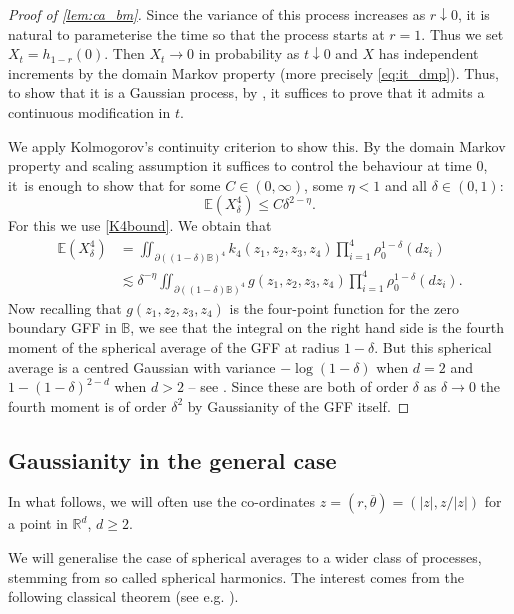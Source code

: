 \documentclass[JEP,XML,SOM,Unicode,published]{cedram}
\theoremstyle{definition}
\newcommand{\R}{\mathbb{R}}
\newcommand{\E}{\mathbb{E}}
\newcommand{\B}{\mathbb{B}}\let\D\B\let\Ub\B
\let\ol\overline
\begin{document}
\begin{proof}[Proof of \cref{lem:ca_bm}]
Since the variance of this process increases as $r\downarrow 0$, it is natural to parameterise the time so that the process starts at $r = 1$. Thus we set $X_t = h_{1-r}(0)$. Then $X_t\to 0$ in probability as $t\downarrow 0$ and $X$ has independent increments by the domain Markov property (more precisely \eqref{eq:it_dmp}). Thus, to show that it is a Gaussian process, by \cite[Th.\,11.4]{Kallenberg}, it suffices to prove that it admits a continuous modification in $t$.

We apply Kolmogorov's continuity criterion to show this. By the domain Markov property and scaling assumption it suffices to control the behaviour at time $0$, \ie it~is enough to show that for some $C\in (0,\infty)$, some $\eta<1$ and all $\delta\in (0,1)$:
\begin{equation}\label{eqn:required_4mom}
\E(X_\delta^4)\le C\delta^{2-\eta}.
\end{equation}
For this we use \eqref{K4bound}. We obtain that
\begin{align*}
\E(X_\delta^4)&=\iint_{\partial((1-\delta)\B)^4} k_4(z_1,z_2,z_3,z_4) \prod_{i=1}^4 \rho_0^{1-\delta}(dz_i)\\
&\lesssim \delta^{-\eta}\iint_{\partial((1-\delta)\B)^4} g(z_1,z_2,z_3,z_4) \prod_{i=1}^4 \rho_0^{1-\delta}(dz_i).
\end{align*}
Now recalling that $g(z_1,z_2,z_3,z_4)$ is the four-point function for the zero boundary GFF in $\B$, we see that the integral on the right hand side is the fourth moment of the spherical average of the GFF at radius $1-\delta$. But this spherical average is a centred Gaussian with variance $-\log(1-\delta)$ when $d=2$ and $1-(1-\delta)^{2-d}$ when $d>2$ -- see \cite[Eq.\,(13)]{WPgff}. Since these are both of order $\delta$ as $\delta\to 0$ the fourth moment is of order $\delta^2$ by Gaussianity {of the GFF itself}.
\end{proof}

\subsection{Gaussianity in the general case}

 In what follows, we will often use the co-ordinates $z=(r,\ol{\theta})=(|z|,z/|z|)$ for a point in $\R^d$, $d\ge 2$.

We will generalise {the case of spherical averages} to a wider class of processes, stemming from so called spherical harmonics. The interest comes from the following classical theorem (see e.g. \cite[Chap.\,IV]{SteinWeiss}).
\end{document}
